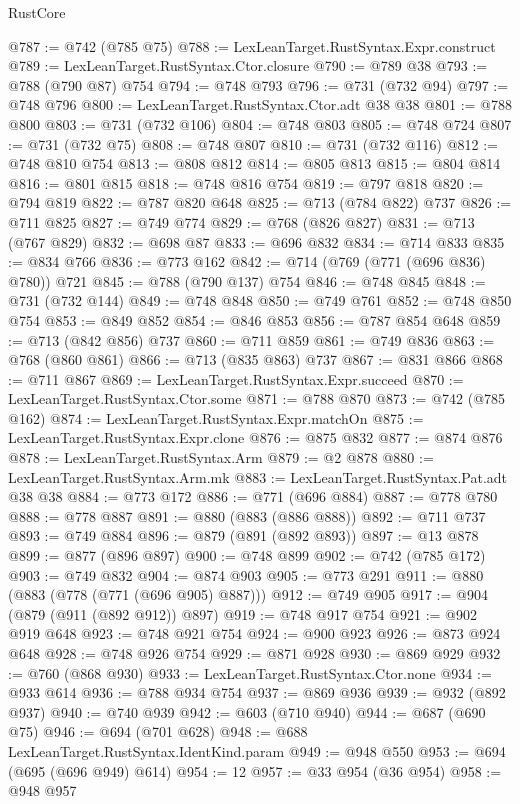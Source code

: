 \begin{lexlean}{RustCore}
\begin{coremodule}
@787 := @742 (@785 @75)
@788 := LexLeanTarget.RustSyntax.Expr.construct
@789 := LexLeanTarget.RustSyntax.Ctor.closure
@790 := @789 @38
@793 := @788 (@790 @87) @754
@794 := @748 @793
@796 := @731 (@732 @94)
@797 := @748 @796
@800 := LexLeanTarget.RustSyntax.Ctor.adt @38 @38
@801 := @788 @800
@803 := @731 (@732 @106)
@804 := @748 @803
@805 := @748 @724
@807 := @731 (@732 @75)
@808 := @748 @807
@810 := @731 (@732 @116)
@812 := @748 @810 @754
@813 := @808 @812
@814 := @805 @813
@815 := @804 @814
@816 := @801 @815
@818 := @748 @816 @754
@819 := @797 @818
@820 := @794 @819
@822 := @787 @820 @648
@825 := @713 (@784 @822) @737
@826 := @711 @825
@827 := @749 @774
@829 := @768 (@826 @827)
@831 := @713 (@767 @829)
@832 := @698 @87
@833 := @696 @832
@834 := @714 @833
@835 := @834 @766
@836 := @773 @162
@842 := @714 (@769 (@771 (@696 @836) @780)) @721
@845 := @788 (@790 @137) @754
@846 := @748 @845
@848 := @731 (@732 @144)
@849 := @748 @848
@850 := @749 @761
@852 := @748 @850 @754
@853 := @849 @852
@854 := @846 @853
@856 := @787 @854 @648
@859 := @713 (@842 @856) @737
@860 := @711 @859
@861 := @749 @836
@863 := @768 (@860 @861)
@866 := @713 (@835 @863) @737
@867 := @831 @866
@868 := @711 @867
@869 := LexLeanTarget.RustSyntax.Expr.succeed
@870 := LexLeanTarget.RustSyntax.Ctor.some
@871 := @788 @870
@873 := @742 (@785 @162)
@874 := LexLeanTarget.RustSyntax.Expr.matchOn
@875 := LexLeanTarget.RustSyntax.Expr.clone
@876 := @875 @832
@877 := @874 @876
@878 := LexLeanTarget.RustSyntax.Arm
@879 := @2 @878
@880 := LexLeanTarget.RustSyntax.Arm.mk
@883 := LexLeanTarget.RustSyntax.Pat.adt @38 @38
@884 := @773 @172
@886 := @771 (@696 @884)
@887 := @778 @780
@888 := @778 @887
@891 := @880 (@883 (@886 @888))
@892 := @711 @737
@893 := @749 @884
@896 := @879 (@891 (@892 @893))
@897 := @13 @878
@899 := @877 (@896 @897)
@900 := @748 @899
@902 := @742 (@785 @172)
@903 := @749 @832
@904 := @874 @903
@905 := @773 @291
@911 := @880 (@883 (@778 (@771 (@696 @905) @887)))
@912 := @749 @905
@917 := @904 (@879 (@911 (@892 @912)) @897)
@919 := @748 @917 @754
@921 := @902 @919 @648
@923 := @748 @921 @754
@924 := @900 @923
@926 := @873 @924 @648
@928 := @748 @926 @754
@929 := @871 @928
@930 := @869 @929
@932 := @760 (@868 @930)
@933 := LexLeanTarget.RustSyntax.Ctor.none
@934 := @933 @614
@936 := @788 @934 @754
@937 := @869 @936
@939 := @932 (@892 @937)
@940 := @740 @939
@942 := @603 (@710 @940)
@944 := @687 (@690 @75)
@946 := @694 (@701 @628)
@948 := @688 LexLeanTarget.RustSyntax.IdentKind.param
@949 := @948 @550
@953 := @694 (@695 (@696 @949) @614)
@954 := 12
@957 := @33 @954 (@36 @954)
@958 := @948 @957

\end{coremodule}
\end{lexlean}
